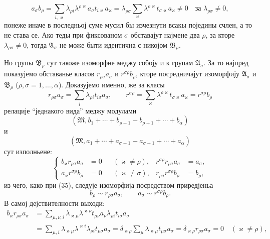 ﻿\documentclass[11pt]{article}
\begin{document}
\[
 a_\sigma b_\rho=
 \sum_{i,\varkappa}\lambda_{\rho i}\lambda^{\rho\varkappa}a_\sigma t_{i\varkappa}a_\varkappa
 =\lambda_{\rho\sigma}
 \sum_{\varkappa}\lambda^{\rho\varkappa}t_{\sigma\varkappa}a_\varkappa\ne0
 \quad\text{за }\lambda_{\rho\sigma}\ne0,
\]
понеже иначе в последньој суме мусил бы изчезнути всакы поједины счлен, а то не става се. Ако теды при фиксованом \(\sigma\) обставајут најмене два \(\rho\), за кторе \(\lambda_{\rho\sigma}\ne0\), тогда \(\mathfrak A_\sigma\) не може быти идентична с никојом \(\mathfrak B_\rho\).

Но групы \(\mathfrak B_\rho\) сут такоже изоморфне меджу собоју и к групам \(\mathfrak A_\sigma\). За то најпред показујемо обставанье класов \(r_{\rho\sigma}a_\sigma\) и \(r^{\sigma\rho}b_\rho\), кторе посредничајут изоморфију \(\mathfrak A_\sigma\) и \(\mathfrak B_\rho\) (\(\rho,\sigma=1,
\ldots,\alpha\)). Доказујемо именно, же за класы
\[
 r_{\rho\sigma}a_\sigma=\sum_i\lambda_{\rho i}t_{i\sigma}a_\sigma,
 \qquad
 r^{\sigma\rho}=\sum_\varkappa\lambda^{\rho\varkappa}t_{\sigma\varkappa}a_\varkappa
 =r^{\sigma\rho}b_\rho
\]
релације ``једнакого вида'' меджу модулами
\[
 (\mathfrak M,b_1+\cdots+b_{\rho-1}+b_{\rho+1}+\cdots+b_\alpha)
\]
и
\[
 (\mathfrak M,a_1+\cdots+a_{\sigma-1}+a_{\sigma+1}+\cdots+a_\alpha)
\]
сут изполньене:
\begin{equation}
\left\{
\begin{aligned}
 b_\varkappa r_{\rho\sigma}a_\sigma&=0 &&(\varkappa\ne\rho),&
 r^{\sigma\rho}r_{\rho\sigma}a_\sigma&=a_\sigma,\\
 a_\varkappa r^{\sigma\rho}b_\rho&=0 &&(\varkappa\ne\sigma),&
 r_{\rho\sigma}r^{\sigma\rho}b_\rho&=b_\rho,
\end{aligned}\right.
\tag{39}
\end{equation}
из чего, како при (35), следује изоморфија посредством приредјеньа
\begin{equation}
 b_\rho\sim r_{\rho\sigma}a_\sigma,
 \qquad
 a_\sigma\sim r^{\sigma\rho}b_\rho.
\tag{40}
\end{equation}
В самој дејствителности выходи:
\[
\begin{aligned}
 b_\varkappa r_{\rho\sigma}a_\sigma
 &=\sum_{\mu,\nu,i}\lambda_{\varkappa\mu}\lambda^{\varkappa\nu}t_{\mu\nu}a_\nu\lambda_{\rho i}t_{i\sigma}a_\sigma\\
 &=\sum_{\mu,i}\lambda_{\varkappa\mu}\lambda^{\varkappa i}\lambda_{\rho i}t_{\mu\sigma}a_\sigma
 =\delta_{\varkappa\rho}\sum_\mu\lambda_{\varkappa\mu}t_{\mu\sigma}a_\sigma
 =\delta_{\varkappa\rho}r_{\rho\sigma}a_\sigma=0\quad(\varkappa\ne\rho),
\end{aligned}
\]
\end{document}
